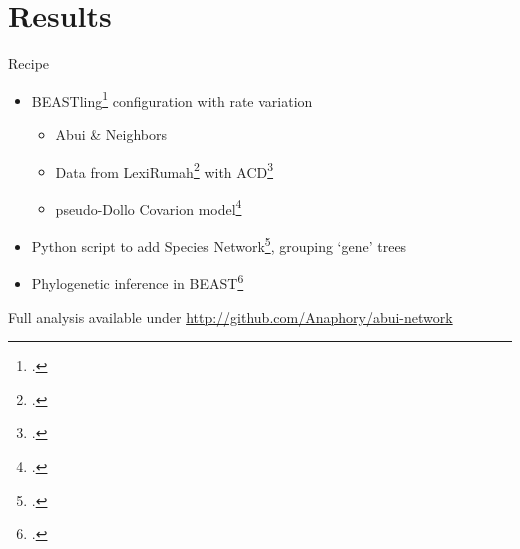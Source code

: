 \documentclass[
10pt,
]{beamer}
\begin{document}
\section{Results}
\begin{frame}{Recipe}
  \begin{itemize}
  \item BEASTling\footcite{maurits2017beastling} configuration with rate variation
    \begin{itemize}
      \item Abui \& Neighbors
      \item Data from LexiRumah\footcite{lexirumahpaper} with ACD\footcite{list2012lexstat}
      \item pseudo-Dollo Covarion model\footcite{bouckaert2017pseudo}
    \end{itemize}
  \item Python script to add Species Network\footcite{zhang2018bayesian},
    grouping ‘gene’ trees
  \item Phylogenetic inference in BEAST\footcite{bouckaert2014beast}
  \end{itemize}
  Full analysis available under \url{http://github.com/Anaphory/abui-network}
\end{frame}
\end{document}
